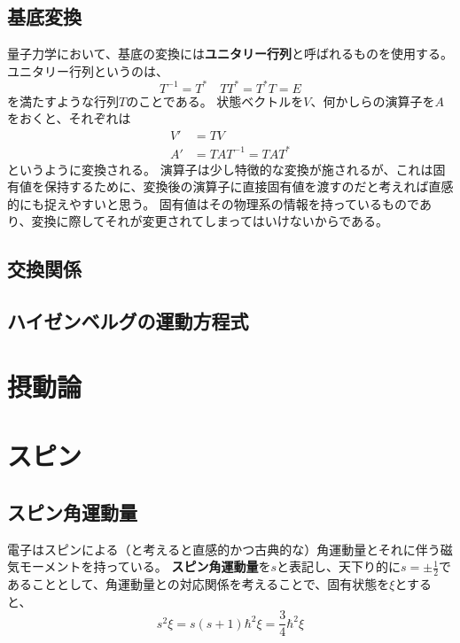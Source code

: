 \documentclass[a4paper]{jsreport}
\begin{document}
        \section{基底変換}
            量子力学において、基底の変換には\textbf{ユニタリー行列}と呼ばれるものを使用する。
            ユニタリー行列というのは、
            \begin{equation}
                T^{-1} = T^\ast \quad  TT^\ast = T^\ast T = E
            \end{equation}
            を満たすような行列$T$のことである。
            状態ベクトルを$V$、何かしらの演算子を$A$をおくと、それぞれは
            \begin{align}
                V' &= TV \\
                A' &= TAT^{-1} = TAT^\ast
            \end{align}
            というように変換される。
            演算子は少し特徴的な変換が施されるが、これは固有値を保持するために、変換後の演算子に直接固有値を渡すのだと考えれば直感的にも捉えやすいと思う。
            固有値はその物理系の情報を持っているものであり、変換に際してそれが変更されてしまってはいけないからである。

        \section{交換関係}
            

        \section{ハイゼンベルグの運動方程式}

    \chapter{摂動論}
        
            
    \chapter{スピン}
        \section{スピン角運動量}
            電子はスピンによる（と考えると直感的かつ古典的な）角運動量とそれに伴う磁気モーメントを持っている。
            \textbf{スピン角運動量}を$s$と表記し、天下り的に$s=\pm \frac{1}{2}$であることとして、角運動量との対応関係を考えることで、固有状態を$\xi$とすると、
            \begin{equation}
                s^2 \xi = s(s+1)\hbar^2 \xi = \frac{3}{4}\hbar^2 \xi
            \end{equation}
\end{document}
